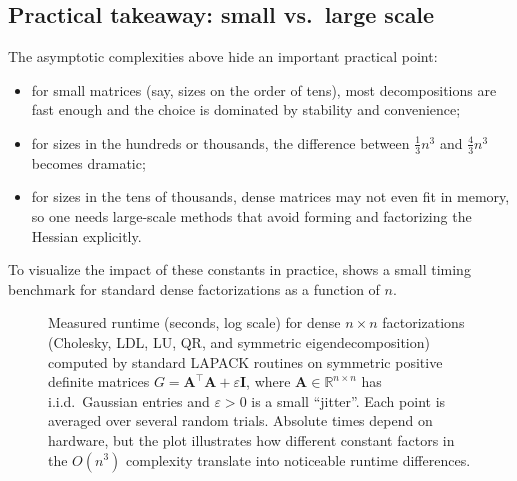 \subsection{Practical takeaway: small vs.\ large scale}
\label{sec:ch3-linear-algebra-takeaway}
The asymptotic complexities above hide an important practical point:
\begin{itemize}
  \item for small matrices (say, sizes on the order of tens), most
  decompositions are fast enough and the choice is dominated by stability and
  convenience;
  \item for sizes in the hundreds or thousands, the difference between
  $\tfrac13n^3$ and $\tfrac{4}{3}n^3$ becomes dramatic;
  \item for sizes in the tens of thousands, dense matrices may not even fit
  in memory, so one needs large-scale methods that avoid forming and
  factorizing the Hessian explicitly.
\end{itemize}
To visualize the impact of these constants in practice,
 shows a small timing benchmark for
standard dense factorizations as a function of $n$.
\begin{figure}[ht]
    \centering
    \caption{Measured runtime (seconds, log scale) for dense $n\times n$
    factorizations (Cholesky, LDL, LU, QR, and symmetric eigendecomposition)
    computed by standard LAPACK routines on symmetric positive definite 
    matrices $G=\mathbf{A}^\top\mathbf{A}+\varepsilon\mathbf{I}$, where
    $\mathbf{A}\in\mathbb{R}^{n\times n}$ has i.i.d.\ Gaussian entries and
    $\varepsilon>0$ is a small ``jitter''. Each point is averaged over several
    random trials. Absolute times depend on
    hardware, but the plot illustrates how different constant factors in the
    $O(n^3)$ complexity translate into noticeable runtime differences.}
    \label{fig:ch3-factorization-costs}
\end{figure}

